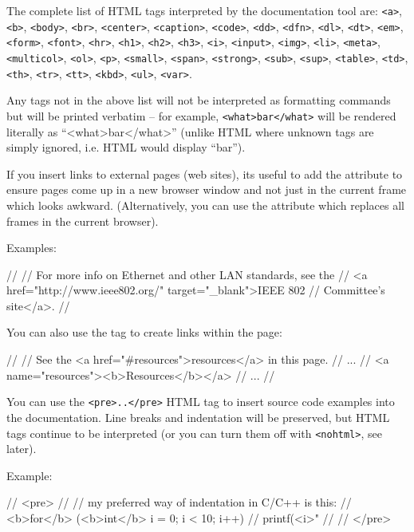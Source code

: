 The complete list of HTML tags interpreted by the documentation tool are:
\texttt{<a>}, \texttt{<b>}, \texttt{<body>}, \texttt{<br>}, \texttt{<center>},
\texttt{<caption>}, \texttt{<code>}, \texttt{<dd>}, \texttt{<dfn>}, \texttt{<dl>},
\texttt{<dt>}, \texttt{<em>}, \texttt{<form>}, \texttt{<font>}, \texttt{<hr>},
\texttt{<h1>}, \texttt{<h2>}, \texttt{<h3>}, \texttt{<i>}, \texttt{<input>}, \texttt{<img>},
\texttt{<li>}, \texttt{<meta>}, \texttt{<multicol>}, \texttt{<ol>}, \texttt{<p>}, \texttt{<small>},
\texttt{<span>}, \texttt{<strong>},
\texttt{<sub>}, \texttt{<sup>}, \texttt{<table>}, \texttt{<td>}, \texttt{<th>}, \texttt{<tr>},
\texttt{<tt>}, \texttt{<kbd>}, \texttt{<ul>}, \texttt{<var>}.

Any tags not in the above list will not be interpreted as formatting commands
but will be printed verbatim -- for example, \texttt{<what>bar</what>}
will be rendered literally as ``<what>bar</what>'' (unlike HTML where
unknown tags are simply ignored, i.e. HTML would display ``bar'').

If you insert links to external pages (web sites), its useful to add
the  attribute to ensure pages come up in a new
browser window and not just in the current frame which looks awkward.
(Alternatively, you can use the  attribute
which replaces all frames in the current browser).

Examples:

\begin{ned}
//
// For more info on Ethernet and other LAN standards, see the
// <a href="http://www.ieee802.org/" target="_blank">IEEE 802
// Committee's site</a>.
//
\end{ned}

You can also use the  tag to create links within the page:

\begin{ned}
//
// See the <a href="#resources">resources</a> in this page.
// ...
// <a name="resources"><b>Resources</b></a>
// ...
//
\end{ned}

You can use the \texttt{<pre>..</pre>} HTML tag to insert source code examples
into the documentation. Line breaks and indentation will be preserved,
but HTML tags continue to be interpreted (or you can turn them off
with \texttt{<nohtml>}, see later).

Example:

\begin{ned}
// <pre>
// // my preferred way of indentation in C/C++ is this:
// <b>for</b> (<b>int</b> i = 0; i < 10; i++) {
//     printf(<i>"%
// }
// </pre>
\end{ned}

